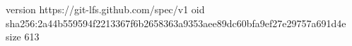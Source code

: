 version https://git-lfs.github.com/spec/v1
oid sha256:2a44b559594f2213367f6b2658363a9353aee89dc60bfa9ef27e29757a691d4e
size 613
